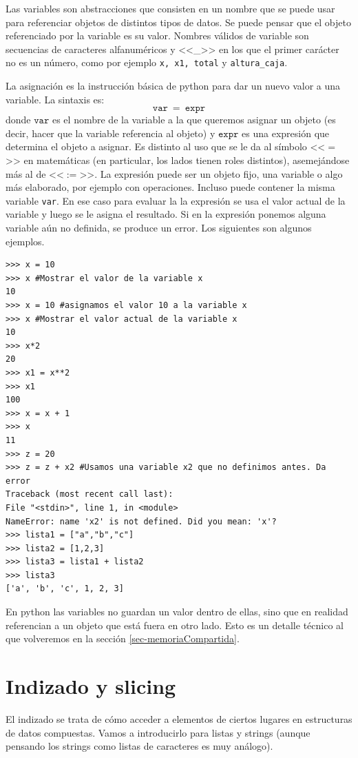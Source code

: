 \documentclass[a4paper, 12pt]{report}
\theoremstyle{definition}
\begin{document}
Las variables son abstracciones que consisten en un nombre que se puede usar para referenciar objetos de distintos tipos de datos. Se puede pensar que el objeto referenciado por la variable es su valor. Nombres válidos de variable son secuencias de caracteres alfanuméricos y <<\_>> en los que el primer carácter no es un número, como por ejemplo {\tt x, x1, total} y {\tt altura\_caja}.

La asignación es la instrucción básica de python para dar un nuevo valor a una variable. La sintaxis es:
$$\mathtt{var}~=~\mathtt{expr}$$
donde $\mathtt{var}$ es el nombre de la variable a la que queremos asignar un objeto (es decir, hacer que la variable referencia al objeto) y $\mathtt{expr}$ es una expresión que determina el objeto a asignar.  Es distinto al uso que se le da al símbolo <<$=$>> en matemáticas (en particular, los lados tienen roles distintos), asemejándose más al de <<$:=$>>. La expresión puede ser un objeto fijo, una variable o algo más elaborado, por ejemplo con operaciones. Incluso puede contener la misma variable {\tt var}. En ese caso para evaluar la la expresión se usa el valor actual de la variable y luego se le asigna el resultado. Si en la expresión ponemos alguna variable aún no definida, se produce un error. Los siguientes son algunos ejemplos.

\begin{verbatim}
>>> x = 10
>>> x #Mostrar el valor de la variable x
10
>>> x = 10 #asignamos el valor 10 a la variable x
>>> x #Mostrar el valor actual de la variable x
10
>>> x*2
20
>>> x1 = x**2
>>> x1
100
>>> x = x + 1
>>> x
11
>>> z = 20
>>> z = z + x2 #Usamos una variable x2 que no definimos antes. Da error
Traceback (most recent call last):
File "<stdin>", line 1, in <module>
NameError: name 'x2' is not defined. Did you mean: 'x'?
>>> lista1 = ["a","b","c"]
>>> lista2 = [1,2,3]
>>> lista3 = lista1 + lista2
>>> lista3
['a', 'b', 'c', 1, 2, 3]
\end{verbatim}
En python las variables no guardan un valor dentro de ellas, sino que en realidad referencian a un objeto que está fuera en otro lado. Esto es un detalle técnico al que volveremos en la sección \ref{sec-memoriaCompartida}.
\section{Indizado y slicing}

El indizado se trata de cómo acceder a elementos de ciertos lugares en estructuras de datos compuestas. Vamos a introducirlo para listas y strings (aunque pensando los strings como listas de caracteres es muy análogo).
\end{document}
